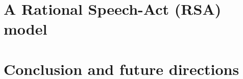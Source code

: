 \documentclass[10pt,letterpaper]{article}
\begin{document}
 
\section{A Rational Speech-Act (RSA) model}
\label{sec:RSA}


%

\section{Conclusion and future directions}
\label{sec:Conclusion}










\setlength{\bibleftmargin}{.125in}
\setlength{\bibindent}{-\bibleftmargin}

\def\thebibliography#1{\section*{References}
 \small
 \list
 {[\arabic{enumi}]}{\leftmargin \parindent
   \itemindent -\parindent
   \itemsep 0ex plus 1pt
   \parsep 0.1ex plus 1pt minus 1pt
   \usecounter{enumi}}
   \def\newblock{\hskip .11em plus .33em minus .07em}
   \sloppy\clubpenalty4000\widowpenalty4000
   \sfcode`\.=1000\relax}

\end{document}
